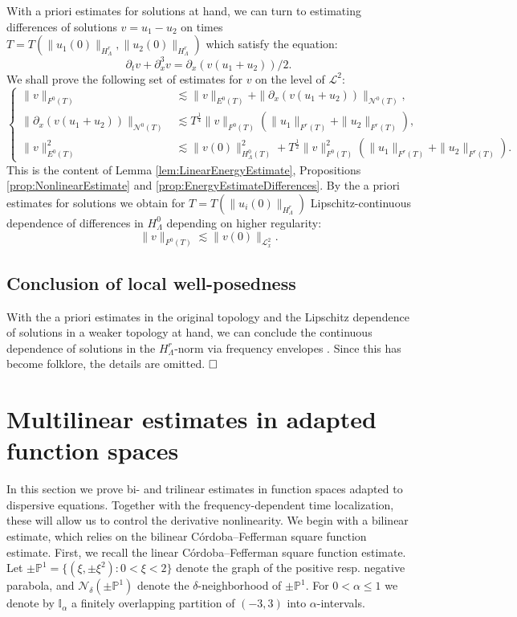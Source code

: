 \documentclass{amsart}
\theoremstyle{definition}
\begin{document}
With a priori estimates for solutions at hand, we can turn to estimating differences of solutions $v = u_1 - u_2$ on times $T=T(\| u_1(0) \|_{H^r_\Lambda}, \| u_2(0) \|_{H^r_\Lambda})$ which satisfy the equation:
\begin{equation*}
\partial_t v + \partial_x^3 v = \partial_x (v(u_1 + u_2))/2.
\end{equation*}
We shall prove the following set of estimates for $v$ on the level of $\mathcal{L}^2$:
\begin{equation*}
\left\{ \begin{array}{cl}
\| v \|_{F^{0}(T)} &\lesssim \| v \|_{E^{0}(T)} + \| \partial_x (v(u_1+u_2))\|_{\mathcal{N}^{0}(T)}, \\
\| \partial_x (v(u_1+u_2))\|_{\mathcal{N}^{0}(T)} &\lesssim T^{\frac{1}{4}} \| v \|_{F^{0}(T)} (\| u_1 \|_{F^{r}(T)} + \| u_2 \|_{F^{r}(T)}), \\
\| v \|^2_{E^{0}(T)} &\lesssim \| v(0) \|^2_{H_\Lambda^{0}(T)} + T^{\frac{1}{2}} \| v \|_{F^{0}(T)}^2 (\| u_1 \|_{F^{r}(T)} + \| u_2 \|_{F^{r}(T)}).
\end{array} \right.
\end{equation*}
This is the content of Lemma \ref{lem:LinearEnergyEstimate}, Propositions \ref{prop:NonlinearEstimate} and \ref{prop:EnergyEstimateDifferences}.
By the a priori estimates for solutions we obtain for $T=T(\| u_i(0) \|_{H_{\Lambda}^{r}})$ Lipschitz-continuous dependence of differences in $H^0_{\Lambda}$ depending on higher regularity:
\begin{equation*}
\| v \|_{F^{0}(T)} \lesssim \| v(0) \|_{\mathcal{L}^2_x}.
\end{equation*}

\subsection{Conclusion of local well-posedness}

With the a priori estimates in the original topology and the Lipschitz dependence of solutions in a weaker topology at hand, we can conclude the continuous dependence of solutions in the $H^r_{\Lambda}$-norm via frequency envelopes \cite{Tao2004}. Since this has become folklore, the details are omitted.
$\hfill \Box$

\section{Multilinear estimates in adapted function spaces}
\label{section:Trilinear}
In this section we prove bi- and trilinear estimates in function spaces adapted to dispersive equations. Together with the frequency-dependent time localization, these will allow us to control the derivative nonlinearity.
We begin with a bilinear estimate, which relies on the bilinear C\'ordoba--Fefferman square function estimate. First, we recall the linear C\'ordoba--Fefferman square function estimate. Let $\pm \mathbb{P}^1 = \{ (\xi,\pm \xi^2) : 0 < \xi < 2 \}$ denote the graph of the positive resp. negative parabola, and $\mathcal{N}_{\delta}(\pm \mathbb{P}^1)$ denote the $\delta$-neighborhood of $\pm \mathbb{P}^1$. For $0< \alpha \leq 1$ we denote by $\mathbb{I}_{\alpha}$ a finitely overlapping partition of $(-3,3)$ into $\alpha$-intervals.
\end{document}

